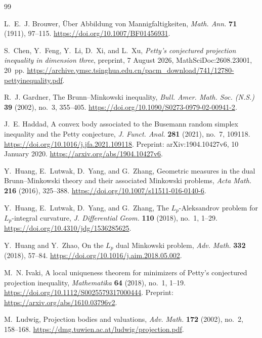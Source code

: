 \begingroup
\small
\begin{thebibliography}{99}

L.~E.~J. Brouwer, \"Uber Abbildung von Mannigfaltigkeiten,
\emph{Math. Ann.} \textbf{71} (1911), 97--115.
\url{https://doi.org/10.1007/BF01456931}.

S.~Chen, Y.~Feng, Y.~Li, D.~Xi, and L.~Xu,
\emph{Petty's conjectured projection inequality in dimension three},
preprint, 7 August 2026, MathSciDoc:2608.23001, 20~pp.
\url{https://archive.ymsc.tsinghua.edu.cn/pacm_download/741/12780-pettyinequality.pdf}.

R.~J. Gardner, The Brunn--Minkowski inequality,
\emph{Bull. Amer. Math. Soc. (N.S.)} \textbf{39} (2002), no.~3, 355--405.
\url{https://doi.org/10.1090/S0273-0979-02-00941-2}.

J.~E. Haddad,
A convex body associated to the Busemann random simplex inequality
and the Petty conjecture,
\emph{J. Funct. Anal.} \textbf{281} (2021), no.~7, 109118.
\url{https://doi.org/10.1016/j.jfa.2021.109118}.
Preprint: arXiv:1904.10427v6, 10 January 2020.
\url{https://arxiv.org/abs/1904.10427v6}.

Y.~Huang, E.~Lutwak, D.~Yang, and G.~Zhang,
Geometric measures in the dual Brunn--Minkowski theory and their associated
Minkowski problems, \emph{Acta Math.} \textbf{216} (2016), 325--388.
\url{https://doi.org/10.1007/s11511-016-0140-6}.

Y.~Huang, E.~Lutwak, D.~Yang, and G.~Zhang,
The $L_p$-Aleksandrov problem for $L_p$-integral curvature,
\emph{J. Differential Geom.} \textbf{110} (2018), no.~1, 1--29.
\url{https://doi.org/10.4310/jdg/1536285625}.

Y.~Huang and Y.~Zhao, On the $L_p$ dual Minkowski problem,
\emph{Adv. Math.} \textbf{332} (2018), 57--84.
\url{https://doi.org/10.1016/j.aim.2018.05.002}.

M.~N. Ivaki, A local uniqueness theorem for minimizers of Petty's conjectured
projection inequality, \emph{Mathematika} \textbf{64} (2018), no.~1, 1--19.
\url{https://doi.org/10.1112/S0025579317000444}.
Preprint: \url{https://arxiv.org/abs/1610.03796v2}.

M.~Ludwig, Projection bodies and valuations,
\emph{Adv. Math.} \textbf{172} (2002), no.~2, 158--168.
\url{https://dmg.tuwien.ac.at/ludwig/projection.pdf}.


\end{thebibliography}
